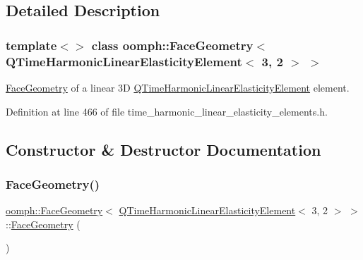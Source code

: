 \subsection{Detailed Description}
\subsubsection*{template$<$$>$\newline
class oomph\+::\+Face\+Geometry$<$ Q\+Time\+Harmonic\+Linear\+Elasticity\+Element$<$ 3, 2 $>$ $>$}

\hyperlink{classoomph_1_1FaceGeometry}{Face\+Geometry} of a linear 3D \hyperlink{classoomph_1_1QTimeHarmonicLinearElasticityElement}{Q\+Time\+Harmonic\+Linear\+Elasticity\+Element} element. 

Definition at line 466 of file time\+\_\+harmonic\+\_\+linear\+\_\+elasticity\+\_\+elements.\+h.



\subsection{Constructor \& Destructor Documentation}
\mbox{\label{classoomph_1_1FaceGeometry_3_01QTimeHarmonicLinearElasticityElement_3_013_00_012_01_4_01_4_a92bee65f5bbe86bf686cbacb9c65e97d}} 
\subsubsection{\texorpdfstring{Face\+Geometry()}{FaceGeometry()}}
{\footnotesize\ttfamily \hyperlink{classoomph_1_1FaceGeometry}{oomph\+::\+Face\+Geometry}$<$ \hyperlink{classoomph_1_1QTimeHarmonicLinearElasticityElement}{Q\+Time\+Harmonic\+Linear\+Elasticity\+Element}$<$ 3, 2 $>$ $>$\+::\hyperlink{classoomph_1_1FaceGeometry}{Face\+Geometry} (\begin{DoxyParamCaption}{ }\end{DoxyParamCaption})\hspace{0.3cm}{\ttfamily [inline]}}



